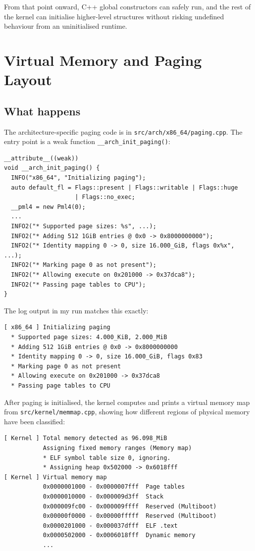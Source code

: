 \documentclass[a4paper,11pt]{article}
\begin{document}
From that point onward, C++ global constructors can safely run, and the
rest of the kernel can initialise higher-level structures without
risking undefined behaviour from an uninitialised runtime.

\section{Virtual Memory and Paging Layout}

\subsection{What happens}

The architecture-specific paging code is in
\texttt{src/arch/x86\_64/paging.cpp}. The entry point is a weak function
\texttt{\_\_arch\_init\_paging()}:

\begin{verbatim}
__attribute__((weak))
void __arch_init_paging() {
  INFO("x86_64", "Initializing paging");
  auto default_fl = Flags::present | Flags::writable | Flags::huge
                    | Flags::no_exec;
  __pml4 = new Pml4(0);
  ...
  INFO2("* Supported page sizes: %s", ...);
  INFO2("* Adding 512 1GiB entries @ 0x0 -> 0x8000000000");
  INFO2("* Identity mapping 0 -> 0, size 16.000_GiB, flags 0x%x", ...);
  INFO2("* Marking page 0 as not present");
  INFO2("* Allowing execute on 0x201000 -> 0x37dca8");
  INFO2("* Passing page tables to CPU");
}
\end{verbatim}

The log output in my run matches this exactly:

\begin{verbatim}
[ x86_64 ] Initializing paging
  * Supported page sizes: 4.000_KiB, 2.000_MiB
  * Adding 512 1GiB entries @ 0x0 -> 0x8000000000
  * Identity mapping 0 -> 0, size 16.000_GiB, flags 0x83
  * Marking page 0 as not present
  * Allowing execute on 0x201000 -> 0x37dca8
  * Passing page tables to CPU
\end{verbatim}

After paging is initialised, the kernel computes and prints a virtual
memory map from \texttt{src/kernel/memmap.cpp}, showing how different
regions of physical memory have been classified:

\begin{verbatim}
[ Kernel ] Total memory detected as 96.098_MiB
           Assigning fixed memory ranges (Memory map)
           * ELF symbol table size 0, ignoring.
           * Assigning heap 0x502000 -> 0x6018fff
[ Kernel ] Virtual memory map
           0x0000001000 - 0x0000007fff  Page tables
           0x0000010000 - 0x000009d3ff  Stack
           0x000009fc00 - 0x000009ffff  Reserved (Multiboot)
           0x00000f0000 - 0x00000fffff  Reserved (Multiboot)
           0x0000201000 - 0x000037dfff  ELF .text
           0x0000502000 - 0x0006018fff  Dynamic memory
           ...
\end{verbatim}
\end{document}
